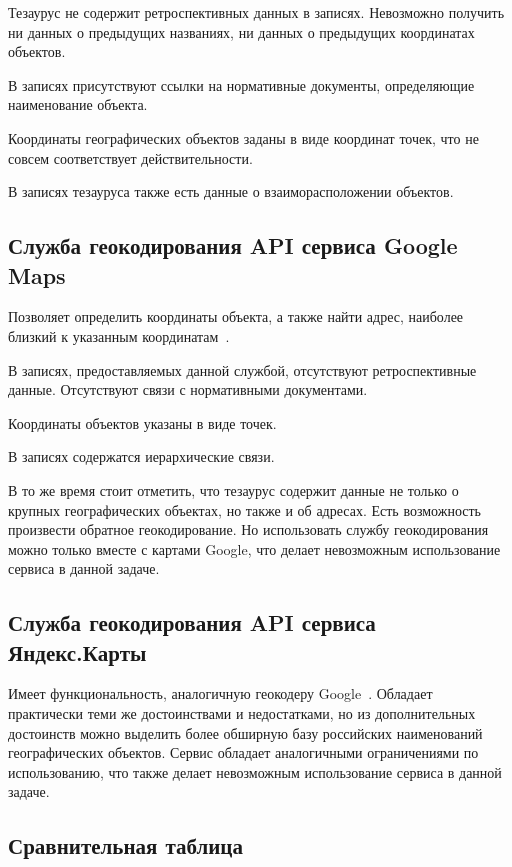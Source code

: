 \begin{multicols}{2}
  Тезаурус не содержит ретроспективных данных в записях. Невозможно получить ни 
данных о предыду\-щих названиях, ни данных о предыдущих координатах объектов.
  
  В записях присутствуют ссылки на нормативные документы, определяющие 
наименование объекта.
  
  Координаты географических объектов заданы в виде координат точек, что не совсем 
соответствует действительности.
  
  В записях тезауруса также есть данные о взаиморасположении объектов.
  
  \subsection{Служба геокодирования {API} сервиса Google Maps}
  
  Позволяет определить координаты объекта, а также найти адрес, наиболее близкий к 
указанным координатам~\cite{11-sk}. 
  
  В записях, предоставляемых данной службой, отсутствуют ретроспективные данные. 
Отсутствуют связи с нормативными документами. 
  
  Координаты объектов указаны в виде точек.
  
  В записях содержатся иерархические связи.
  
  В то же время стоит отметить, что тезаурус содержит данные не только о крупных 
географических объектах, но также и об адресах. Есть возможность произвести обратное 
геокодирование. Но использовать службу геокодирования можно только вместе с картами 
{Google}, что делает невозможным использование сервиса в данной задаче.
  
  \subsection{Служба геокодирования {API} сервиса Яндекс.Карты}
  
  Имеет функциональность, аналогичную геокодеру {Google}~\cite{12-sk}. Обладает 
практически теми же достоинствами и недостатками, но из дополнительных достоинств 
можно выделить более обширную базу российских наименований географических объектов. 
Сервис обладает аналогичными ограничениями по использованию, что также делает 
невозможным использование сервиса в данной задаче.
  
  \subsection{Сравнительная таблица}
  

\end{multicols}
